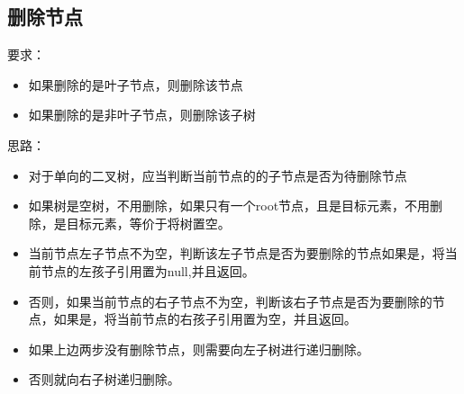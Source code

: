 \documentclass[a4paper]{report}
\begin{document}
\subsection{删除节点}
要求：
\begin{itemize}
  \item 如果删除的是叶子节点，则删除该节点
  \item 如果删除的是非叶子节点，则删除该子树
\end{itemize}

思路：
\begin{itemize}
  \item 对于单向的二叉树，应当判断当前节点的的子节点是否为待删除节点
  \item 如果树是空树，不用删除，如果只有一个root节点，且是目标元素，不用删除，是目标元素，等价于将树置空。
  \item 当前节点左子节点不为空，判断该左子节点是否为要删除的节点如果是，将当前节点的左孩子引用置为null,并且返回。
  \item 否则，如果当前节点的右子节点不为空，判断该右子节点是否为要删除的节点，如果是，将当前节点的右孩子引用置为空，并且返回。
  \item 如果上边两步没有删除节点，则需要向左子树进行递归删除。
  \item 否则就向右子树递归删除。
\end{itemize}
\end{document}
